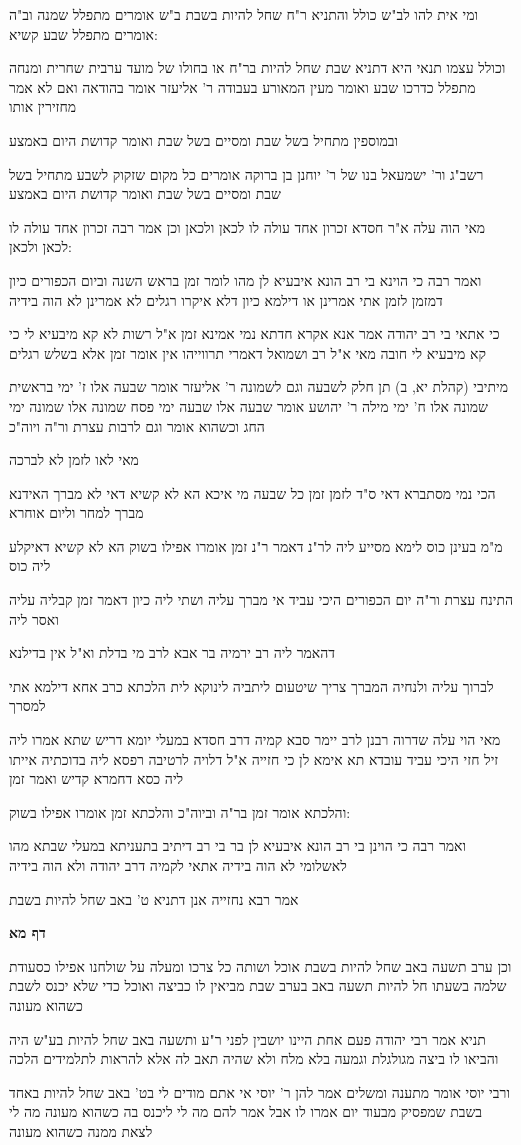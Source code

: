\documentclass[12pt, openany]{book}
\newcommand{\sethebfont}{
\fontsize{10.5pt}{21.0pt} \selectfont
}
\newcommand{\textblock}[1]{
{\sethebfont #1\\}	
}
\newcommand{\sectname}{}
\newcommand{\newsection}[1]{
	\addcontentsline{toc}{section}{#1}
	\renewcommand{\sectname}{#1}	
	\vspace{-\baselineskip}
	\begin{center}
		\textbf{%
\fontsize{16pt}{16pt}\selectfont
			#1}
	\end{center}
	\vspace{-\baselineskip}
	\nopagebreak
}
\begin{document}
\textblock{ומי אית להו לב"ש כולל והתניא ר"ח שחל להיות בשבת ב"ש אומרים מתפלל שמנה וב"ה אומרים מתפלל שבע קשיא:}
\textblock{וכולל עצמו תנאי היא דתניא שבת שחל להיות בר"ח או בחולו של מועד ערבית שחרית ומנחה מתפלל כדרכו שבע ואומר מעין המאורע בעבודה ר' אליעזר אומר בהודאה ואם לא אמר מחזירין אותו}
\textblock{ובמוספין מתחיל בשל שבת ומסיים בשל שבת ואומר קדושת היום באמצע}
\textblock{רשב"ג ור' ישמעאל בנו של ר' יוחנן בן ברוקה אומרים כל מקום שזקוק לשבע מתחיל בשל שבת ומסיים בשל שבת ואומר קדושת היום באמצע}
\textblock{מאי הוה עלה א"ר חסדא זכרון אחד עולה לו לכאן ולכאן וכן אמר רבה זכרון אחד עולה לו לכאן ולכאן:}
\textblock{ואמר רבה כי הוינא בי רב הונא איבעיא לן מהו לומר זמן בראש השנה וביום הכפורים כיון דמזמן לזמן אתי אמרינן או דילמא כיון דלא איקרו רגלים לא אמרינן לא הוה בידיה}
\textblock{כי אתאי בי רב יהודה אמר אנא אקרא חדתא נמי אמינא זמן א"ל רשות לא קא מיבעיא לי כי קא מיבעיא לי חובה מאי א"ל רב ושמואל דאמרי תרווייהו אין אומר זמן אלא בשלש רגלים}
\textblock{מיתיבי (קהלת יא, ב) תן חלק לשבעה וגם לשמונה ר' אליעזר אומר שבעה אלו ז' ימי בראשית שמונה אלו ח' ימי מילה ר' יהושע אומר שבעה אלו שבעה ימי פסח שמונה אלו שמונה ימי החג וכשהוא אומר וגם לרבות עצרת ור"ה ויוה"כ}
\textblock{מאי לאו לזמן לא לברכה}
\textblock{הכי נמי מסתברא דאי ס"ד לזמן זמן כל שבעה מי איכא הא לא קשיא דאי לא מברך האידנא מברך למחר וליום אוחרא}
\textblock{מ"מ בעינן כוס לימא מסייע ליה לר"נ דאמר ר"נ זמן אומרו אפילו בשוק הא לא קשיא דאיקלע ליה כוס}
\textblock{התינח עצרת ור"ה יום הכפורים היכי עביד אי מברך עליה ושתי ליה כיון דאמר זמן קבליה עליה ואסר ליה}
\textblock{דהאמר ליה רב ירמיה בר אבא לרב מי בדלת וא"ל אין בדילנא}
\textblock{לברוך עליה ולנחיה המברך צריך שיטעום ליתביה לינוקא לית הלכתא כרב אחא דילמא אתי למסרך}
\textblock{מאי הוי עלה שדרוה רבנן לרב יימר סבא קמיה דרב חסדא במעלי יומא דריש שתא אמרו ליה זיל חזי היכי עביד עובדא תא אימא לן כי חזייה א"ל דלויה לרטיבה רפסא ליה בדוכתיה אייתו ליה כסא דחמרא קדיש ואמר זמן}
\textblock{והלכתא אומר זמן בר"ה וביוה"כ והלכתא זמן אומרו אפילו בשוק:}
\textblock{ואמר רבה כי הוינן בי רב הונא איבעיא לן בר בי רב דיתיב בתעניתא במעלי שבתא מהו לאשלומי לא הוה בידיה אתאי לקמיה דרב יהודה ולא הוה בידיה}
\textblock{אמר רבא נחזייה אנן דתניא ט' באב שחל להיות בשבת}
\newsection{דף מא}
\textblock{וכן ערב תשעה באב שחל להיות בשבת אוכל ושותה כל צרכו ומעלה על שולחנו אפילו כסעודת שלמה בשעתו חל להיות תשעה באב בערב שבת מביאין לו כביצה ואוכל כדי שלא יכנס לשבת כשהוא מעונה}
\textblock{תניא אמר רבי יהודה פעם אחת היינו יושבין לפני ר"ע ותשעה באב שחל להיות בע"ש היה והביאו לו ביצה מגולגלת וגמעה בלא מלח ולא שהיה תאב לה אלא להראות לתלמידים הלכה}
\textblock{ורבי יוסי אומר מתענה ומשלים אמר להן ר' יוסי אי אתם מודים לי בט' באב שחל להיות באחד בשבת שמפסיק מבעוד יום אמרו לו אבל אמר להם מה לי ליכנס בה כשהוא מעונה מה לי לצאת ממנה כשהוא מעונה}
\end{document}
